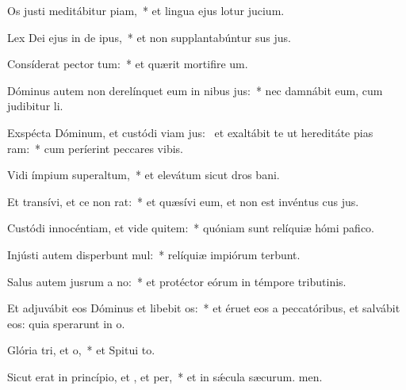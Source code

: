 \item Os justi meditábitur piam,~* et lingua ejus lotur jucium.
\item Lex Dei ejus in de ipus,~* et non supplantabúntur sus jus.
\item Consíderat pector tum:~* et quærit mortifire um.
\item Dóminus autem non derelínquet eum in nibus jus:~* nec damnábit eum, cum judibitur li.
\item Exspécta Dóminum, et custódi viam jus:~\pscross{} et exaltábit te ut hereditáte pias ram:~* cum períerint peccares vibis.
\item Vidi ímpium superaltum,~* et elevátum sicut dros bani.
\item Et transívi, et ce non rat:~* et quæsívi eum, et non est invéntus cus jus.
\item Custódi innocéntiam, et vide quitem:~* quóniam sunt relíquiæ hómi pafico.
\item Injústi autem disperbunt mul:~* relíquiæ impiórum terbunt.
\item Salus autem jusrum a no:~* et protéctor eórum in témpore tributinis.
\item Et adjuvábit eos Dóminus et libebit os:~* et éruet eos a peccatóribus, et salvábit eos: quia sperarunt in o.
\item Glória tri, et o,~* et Spitui to.
\item Sicut erat in princípio, et , et per,~* et in sǽcula sæcurum. men.

